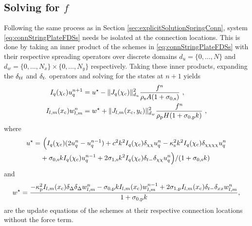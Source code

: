\subsection{Solving for $f$}
Following the same process as in Section \ref{sec:explicitSolutionSpringConn}, system \eqref{eq:connStringPlateFDSs} needs be isolated at the connection locations. This is done by taking an inner product of the schemes in \eqref{eq:connStringPlateFDSs} with their respective spreading operators over discrete domains $d_u = \{0, \hdots, N\}$ and $d_w = \{0, \hdots, N_x\}\times \{0, \hdots, N_y\}$ respectively. Taking these inner products, expanding the $\delta_{tt}$ and $\delta_{t\cdot}$ operators and solving for the states at $n+1$ yields
\begin{align}\label{eq:connStringPlateFDSsAtConn}
    \Iq u_q^{n+1} &= u^\star- \lVert J_q(\chi_\ctxt)\rVert_{d_u}^2\frac{f^n}{\rho_\stxt A(1+\szX[\stxt])}\ ,\\
    \Ilm w_{l,m}^n &= w^\star+ \lVert J_{l, m}(x_\ctxt, y_\ctxt)\rVert_{d_w}^2\frac{f^n}{\rho_\ptxt H(1+\szX[\ptxt]k)}\ ,
\end{align}
where
\begin{align*}
    u^{\star} =&\ \Big(\Iq (2\uqn - u_q^{n-1}) + c^2k^2 \Iq\dcc \uqn - \kappa_\stxt^2k^2 \Iq\dcccc \uqn\\
    &+ \szX[\stxt]k\Iq u_q^{n-1} + 2\soX[\stxt]k^2 \Iq\dtm\dcc \uqn\Big) / (1+\szX[\stxt]k)
\end{align*}
and
\begin{align*}
    w^\star =\frac{-\kappa_\ptxt^2\Ilm\dDelta\dDelta \wlmn - \szX[\ptxt]k\Ilm w_{l,m}^{n-1} + 2\soX[\ptxt] \Ilm\dtm\dxx \wlmn}{1+\szX[\ptxt]k},
\end{align*}
are the update equations of the schemes at their respective connection locations without the force term. 

